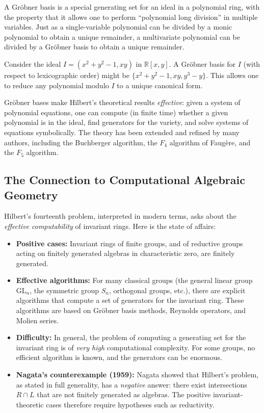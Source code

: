 A Gr\"obner basis is a special generating set for an ideal in a polynomial ring, with the property that it allows one to perform ``polynomial long division'' in multiple variables. Just as a single-variable polynomial can be divided by a monic polynomial to obtain a unique remainder, a multivariate polynomial can be divided by a Gr\"obner basis to obtain a unique remainder.

\begin{example}
Consider the ideal $I = (x^2 + y^2 - 1, xy)$ in $\mathbb{R}[x,y]$. A Gr\"obner basis for $I$ (with respect to lexicographic order) might be $\{x^2 + y^2 - 1, xy, y^3 - y\}$. This allows one to reduce any polynomial modulo $I$ to a unique canonical form.
\end{example}

Gr\"obner bases make Hilbert's theoretical results \emph{effective}: given a system of polynomial equations, one can compute (in finite time) whether a given polynomial is in the ideal, find generators for the variety, and solve systems of equations symbolically. The theory has been extended and refined by many authors, including the Buchberger algorithm, the $F_4$ algorithm of Faug\`ere, and the $F_5$ algorithm.

\subsection{The Connection to Computational Algebraic Geometry}

Hilbert's fourteenth problem, interpreted in modern terms, asks about the \emph{effective computability} of invariant rings. Here is the state of affairs:

\begin{itemize}
    \item \textbf{Positive cases:} Invariant rings of finite groups, and of reductive groups acting on finitely generated algebras in characteristic zero, are finitely generated.
    \item \textbf{Effective algorithms:} For many classical groups (the general linear group $\mathrm{GL}_n$, the symmetric group $S_n$, orthogonal groups, etc.), there are explicit algorithms that compute a set of generators for the invariant ring. These algorithms are based on Gr\"obner basis methods, Reynolds operators, and Molien series.
    \item \textbf{Difficulty:} In general, the problem of computing a generating set for the invariant ring is of \emph{very high} computational complexity. For some groups, no efficient algorithm is known, and the generators can be enormous.
    \item \textbf{Nagata's counterexample (1959):} Nagata showed that Hilbert's problem, as stated in full generality, has a \emph{negative} answer: there exist intersections $R\cap L$ that are not finitely generated as algebras. The positive invariant-theoretic cases therefore require hypotheses such as reductivity.
\end{itemize}

